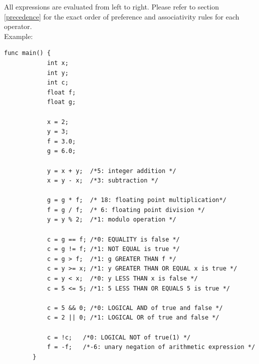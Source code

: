 \documentclass[letterpaper,12pt]{report}
\begin{document}
    All expressions are evaluated from left to right. Please refer to section \ref{precedence} for the exact order of preference and associativity rules for each operator.\\

    Example:\\
    \begin{lstlisting}[style=sol]
        func main() {
            int x;
            int y;
            int c;
            float f;
            float g;

            x = 2;
            y = 3;
            f = 3.0;
            g = 6.0;

            y = x + y;  /*5: integer addition */
            x = y - x;  /*3: subtraction */

            g = g * f;  /* 18: floating point multiplication*/
            f = g / f;  /* 6: floating point division */
            y = y % 2;  /*1: modulo operation */

            c = g == f; /*0: EQUALITY is false */
            c = g != f; /*1: NOT EQUAL is true */
            c = g > f;  /*1: g GREATER THAN f */
            c = y >= x; /*1: y GREATER THAN OR EQUAL x is true */
            c = y < x;  /*0: y LESS THAN x is false */
            c = 5 <= 5; /*1: 5 LESS THAN OR EQUALS 5 is true */

            c = 5 && 0; /*0: LOGICAL AND of true and false */
            c = 2 || 0; /*1: LOGICAL OR of true and false */

            c = !c;   /*0: LOGICAL NOT of true(1) */
            f = -f;   /*-6: unary negation of arithmetic expression */
        }
    \end{lstlisting} 
\end{document}
